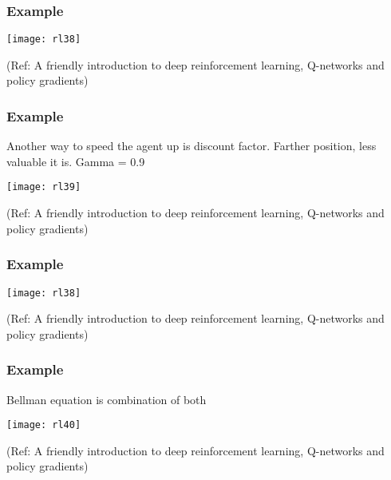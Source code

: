 \begin{frame}[fragile]\frametitle{Example}

\begin{center}
\texttt{[image: rl38]}
\end{center}

{\tiny (Ref: A friendly introduction to deep reinforcement learning, Q-networks and policy gradients)}

\end{frame}

\begin{frame}[fragile]\frametitle{Example}

Another way to speed the agent up is discount factor. Farther position, less valuable it is. Gamma = 0.9

\begin{center}
\texttt{[image: rl39]}
\end{center}

{\tiny (Ref: A friendly introduction to deep reinforcement learning, Q-networks and policy gradients)}

\end{frame}

\begin{frame}[fragile]\frametitle{Example}

\begin{center}
\texttt{[image: rl38]}
\end{center}

{\tiny (Ref: A friendly introduction to deep reinforcement learning, Q-networks and policy gradients)}

\end{frame}

\begin{frame}[fragile]\frametitle{Example}

Bellman equation is combination of both

\begin{center}
\texttt{[image: rl40]}
\end{center}

{\tiny (Ref: A friendly introduction to deep reinforcement learning, Q-networks and policy gradients)}

\end{frame}

